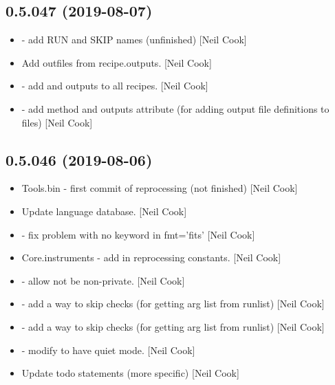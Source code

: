 \documentclass[a4paper,10pt,english]{report}
\begin{document}
\subsection{0.5.047 (2019-08-07)}
\label{\detokenize{misc/changelog:id96}}\begin{itemize}
\item {} 
 - add RUN and SKIP names (unfinished) {[}Neil Cook{]}

\item {} 
Add outfiles from recipe.outputs. {[}Neil Cook{]}

\item {} 
 - add  and outputs to all recipes.
{[}Neil Cook{]}

\item {} 
 - add  method and outputs attribute (for
adding output file definitions to files) {[}Neil Cook{]}

\end{itemize}


\subsection{0.5.046 (2019-08-06)}
\label{\detokenize{misc/changelog:id97}}\begin{itemize}
\item {} 
Tools.bin - first commit of reprocessing (not finished) {[}Neil Cook{]}

\item {} 
Update language database. {[}Neil Cook{]}

\item {} 
 - fix problem with no  keyword in fmt=’fits’
{[}Neil Cook{]}

\item {} 
Core.instruments - add in reprocessing constants. {[}Neil Cook{]}

\item {} 
 - allow  not be non-private. {[}Neil
Cook{]}

\item {} 
 - add a way to skip checks (for getting arg
list from runlist) {[}Neil Cook{]}

\item {} 
 - add a way to skip checks (for getting arg
list from runlist) {[}Neil Cook{]}

\item {} 
 - modify  to have
quiet mode. {[}Neil Cook{]}

\item {} 
Update todo statements (more specific) {[}Neil Cook{]}

\end{itemize}
\end{document}
